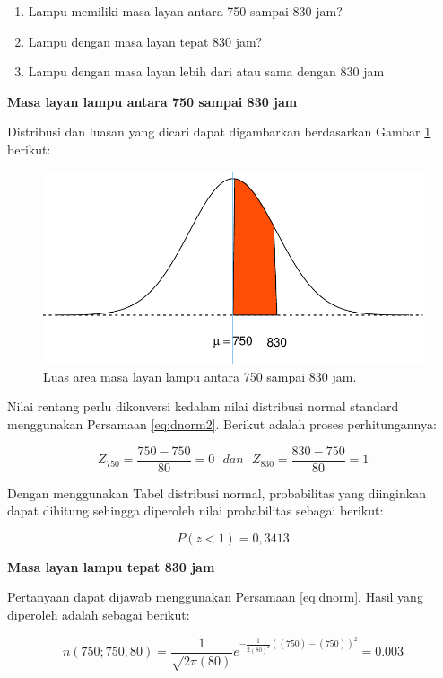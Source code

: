 \documentclass[]{book}
\providecommand{\tightlist}{%
  \setlength{\itemsep}{0pt}\setlength{\parskip}{0pt}}
\begin{document}
\begin{enumerate}
\def\labelenumi{\alph{enumi}.}
\tightlist
\item
  Lampu memiliki masa layan antara 750 sampai 830 jam?
\item
  Lampu dengan masa layan tepat 830 jam?
\item
  Lampu dengan masa layan lebih dari atau sama dengan 830 jam
\end{enumerate}

\textbf{Masa layan lampu antara 750 sampai 830 jam}

Distribusi dan luasan yang dicari dapat digambarkan berdasarkan Gambar
\ref{fig:normvis5} berikut:

\begin{figure}

{\centering \includegraphics[width=0.7\linewidth]{EnvStat_files/figure-latex/normvis5-1} 

}

\caption{Luas area masa layan lampu antara 750 sampai 830 jam.}\label{fig:normvis5}
\end{figure}

Nilai rentang perlu dikonversi kedalam nilai distribusi normal standard
menggunakan Persamaan \eqref{eq:dnorm2}. Berikut adalah proses
perhitungannya:

\[
Z_{750}=\frac{750-750}{80}=0\ \ \ dan\ \ \ Z_{830}=\frac{830-750}{80}=1
\]

Dengan menggunakan Tabel distribusi normal, probabilitas yang diinginkan
dapat dihitung sehingga diperoleh nilai probabilitas sebagai berikut:

\[
P\left(z<1\right)=0,3413
\]

\textbf{Masa layan lampu tepat 830 jam}

Pertanyaan dapat dijawab menggunakan Persamaan \eqref{eq:dnorm}. Hasil
yang diperoleh adalah sebagai berikut:

\[
n\left(750;750,80\right)=\frac{1}{\sqrt{2\pi\left(80\right)}}e^{-\frac{1}{2\left(80\right)^2}\left(\left(750\right)-\left(750\right)\right)^2}=0.003
\]
\end{document}
